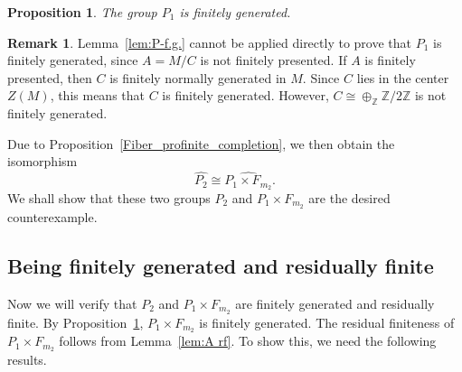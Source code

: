 \documentclass[11pt]{amsart}
\newtheorem{prop}[thm]{Proposition}
\theoremstyle{definition}
\newtheorem{rmk}[thm]{Remark}
\newcommand{\ZZ}{\mathbb{Z}}
\begin{document}
\begin{prop} \label{prop:A f.g.}
 The group $P_1$ is finitely generated.
\end{prop}
\begin{rmk}
Lemma~\ref{lem:P-f.g.} cannot be applied directly to prove that $P_1$ is finitely generated, since $A=M/C$ is not finitely presented.
 If $A$ is finitely presented, then $C$ is finitely normally generated in $M$.
 Since $C$ lies in the center $Z(M)$, this means that $C$ is finitely generated.
 However, $C \cong \oplus_\ZZ \ZZ / 2 \ZZ$ is not finitely generated.
\end{rmk}

Due to Proposition~\ref{Fiber_profinite_completion}, we then obtain the isomorphism 
$$ \widehat{P_2} \cong \widehat{P_1 \times F_{m_2}}. $$
We shall show that these two groups $P_2$ and $P_1 \times F_{m_2}$ are the desired counterexample.

\subsection{Being finitely generated and residually finite}

 Now we will verify that $P_2$ and $P_1 \times F_{m_2}$ are finitely generated and residually finite.
 By Proposition~\ref{prop:A f.g.}, $P_1 \times F_{m_2}$ is finitely generated.
 The residual finiteness of $P_1 \times F_{m_2}$ follows from Lemma~\ref{lem:A rf}.
 To show this, we need the following results.
\end{document}
